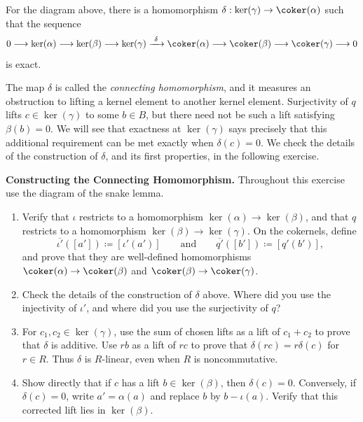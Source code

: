 \documentclass[12pt,reqno]{amsart}
\begin{document}
\begin{theorem}
For the diagram above, there is a homomorphism $\delta:\ker(\gamma)\to\coker(\alpha)$ such that the sequence
\[
0\longrightarrow\ker(\alpha)\longrightarrow\ker(\beta)\longrightarrow\ker(\gamma)\xrightarrow{\ \delta\ }\coker(\alpha)\longrightarrow\coker(\beta)\longrightarrow\coker(\gamma)\longrightarrow0
\]
is exact.
\end{theorem}

The map $\delta$ is called the \emph{connecting homomorphism}, and it measures an obstruction to lifting a kernel element to another kernel element. Surjectivity of $q$ lifts $c\in\ker(\gamma)$ to some $b\in B$, but there need not be such a lift satisfying $\beta(b)=0$. We will see that exactness at $\ker(\gamma)$ says precisely that this additional requirement can be met exactly when $\delta(c)=0$. We check the details of the construction of $\delta$, and its first properties, in the following exercise.

\hrulefill

\begin{problems}
\item\label{p:snakeconstruction} \textbf{Constructing the Connecting Homomorphism.} Throughout this exercise use the diagram of the snake lemma.
\begin{enumerate}
\item Verify that $\iota$ restricts to a homomorphism $\ker(\alpha)\to\ker(\beta)$, and that $q$ restricts to a homomorphism $\ker(\beta)\to\ker(\gamma)$. On the cokernels, define
\[
\overline{\iota'}([a'])\coloneqq[\iota'(a')]\qquad\text{and}\qquad\overline{q'}([b'])\coloneqq[q'(b')],
\]
and prove that they are well-defined homomorphisms $\coker(\alpha)\to\coker(\beta)$ and $\coker(\beta)\to\coker(\gamma)$.
\item Check the details of the construction of $\delta$ above. Where did you use the injectivity of $\iota'$, and where did you use the surjectivity of $q$?
\item For $c_1,c_2\in\ker(\gamma)$, use the sum of chosen lifts as a lift of $c_1+c_2$ to prove that $\delta$ is additive. Use $rb$ as a lift of $rc$ to prove that $\delta(rc)=r\delta(c)$ for $r\in R$. Thus $\delta$ is $R$-linear, even when $R$ is noncommutative.
\item Show directly that if $c$ has a lift $b\in\ker(\beta)$, then $\delta(c)=0$. Conversely, if $\delta(c)=0$, write $a'=\alpha(a)$ and replace $b$ by $b-\iota(a)$. Verify that this corrected lift lies in $\ker(\beta)$.
\end{enumerate}
\end{problems}
\end{document}
